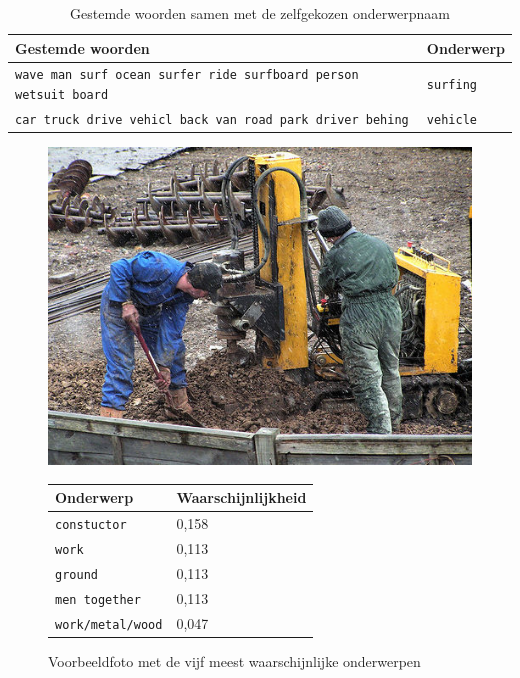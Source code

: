 \begin{table}
	
	\begin{tabular}{ll}
		Gestemde woorden                                               & Onderwerp \\ \hline
		\texttt{\small{wave man surf ocean surfer ride surfboard person wetsuit board}} & \texttt{surfing}       \\
		\texttt{\small{car truck drive vehicl back van road park driver behing}}        & \texttt{vehicle}      \\
	\end{tabular}
	\caption{Gestemde woorden samen met de zelfgekozen onderwerpnaam}	\label{tbl:woorden-naar-topic}
\end{table}


\begin{figure}[h]
	\centering
	\begin{minipage}[t]{.5\linewidth}
		\centering
		\vspace{0pt}
		\includegraphics[width=\textwidth]{Images/LDA/5402085.jpg}
	\end{minipage}\hfill
	\begin{minipage}[t]{.5\textwidth}
		\centering
		\vspace{0pt}
		\begin{tabular}{ll}
			Onderwerp                           & Waarschijnlijkheid\\
			\hline
			\texttt{constuctor}             & 0,158 \\
			\texttt{work}                   & 0,113 \\
			\texttt{ground}                 & 0,113 \\
			\texttt{men together}           & 0,113 \\
			\texttt{work/metal/wood}        & 0,047\\
			\hline
		\end{tabular}
	\end{minipage}
	\caption{Voorbeeldfoto met de vijf meest waarschijnlijke onderwerpen}
	\label{fig:ldatopics}
\end{figure}

